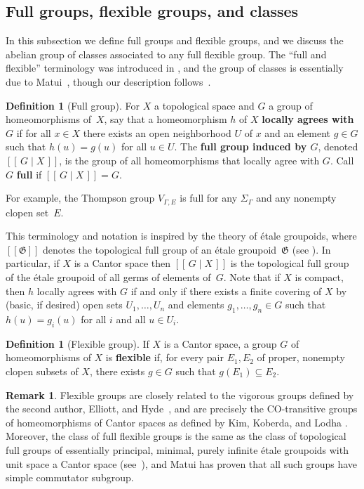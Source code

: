 \documentclass[11pt,letterpaper]{amsart}
\theoremstyle{definition}
\newtheorem{definition}[theorem]{Definition}
\newtheorem{remark}[theorem]{Remark}
\newcommand{\newword}[1]{\textbf{#1}}
\begin{document}
\subsection{Full groups, flexible groups, and classes }\label{ssec:full_irred}

In this subsection we define full groups and flexible groups, and we discuss the abelian group of classes associated to any full flexible group. The ``full and flexible'' terminology was introduced in \cite{Belk-Hyde-Matucci-1}, and the group of classes is essentially due to Matui~\cite[Section~6.2]{Matui15}, though our description follows~\cite[Section~3]{BleakElliottHyde}.

\begin{definition}[Full group]\label{def:full}
For $X$ a topological space and $G$ a group of homeomorphisms of~$X$, say that a homeomorphism $h$ of $X$ \newword{locally agrees with $G$} if for all $x\in X$ there exists an open neighborhood $U$ of $x$ and an element $g\in G$ such that $h(u)=g(u)$ for all $u\in U$. The \newword{full group induced by $G$}, denoted $[[\,G\mid X\,]]$, is the group of all homeomorphisms that locally agree with $G$. Call $G$ \newword{full} if $[[\,G\mid X\,]] = G$.
\end{definition}

For example, the Thompson group $V_{\Gamma,E}$ is full for any $\Sigma_\Gamma$ and any nonempty clopen set~$E$.  

This terminology and notation is inspired by the theory of \'{e}tale groupoids, where $[[\mathfrak{G}]]$ denotes the topological full group of an \'{e}tale groupoid~$\mathfrak{G}$ (see \cite{Matui12,Matui13,Matsumoto15,Matui15,MatuiMatsumoto17}).  In particular, if $X$ is a Cantor space then $[[\,G\mid X\,]]$ is the topological full group of the \'{e}tale groupoid of all germs of elements of~$G$.  Note that if $X$ is compact, then $h$ locally agrees with $G$ if and only if there exists a finite covering of $X$ by (basic, if desired) open sets $U_1,\dots,U_n$ and elements $g_1,\dots,g_n\in G$ such that $h(u)=g_i(u)$ for all $i$ and all $u\in U_i$.

\begin{definition}[Flexible group]
If $X$ is a Cantor space, a group $G$ of homeomorphisms of $X$ is \newword{flexible} if, for every pair $E_1,E_2$ of proper, nonempty clopen subsets of $X$, there exists $g\in G$ such that $g(E_1)\subseteq E_2$.
\end{definition}

\begin{remark}
Flexible groups are closely related to the vigorous groups defined by the second author, Elliott, and Hyde~\cite{BleakElliottHyde}, and are precisely the CO-transitive groups of homeomorphisms of Cantor spaces as defined by Kim, Koberda, and Lodha \cite{KKL,KimKoberdaBook}.  Moreover, the class of full flexible groups is the same as the class of topological full groups of essentially principal, minimal, purely infinite  \'etale groupoids with unit space a Cantor space (see~\cite{Matui15}), and Matui has proven that all such groups have simple commutator subgroup.
\end{remark}
\end{document}
